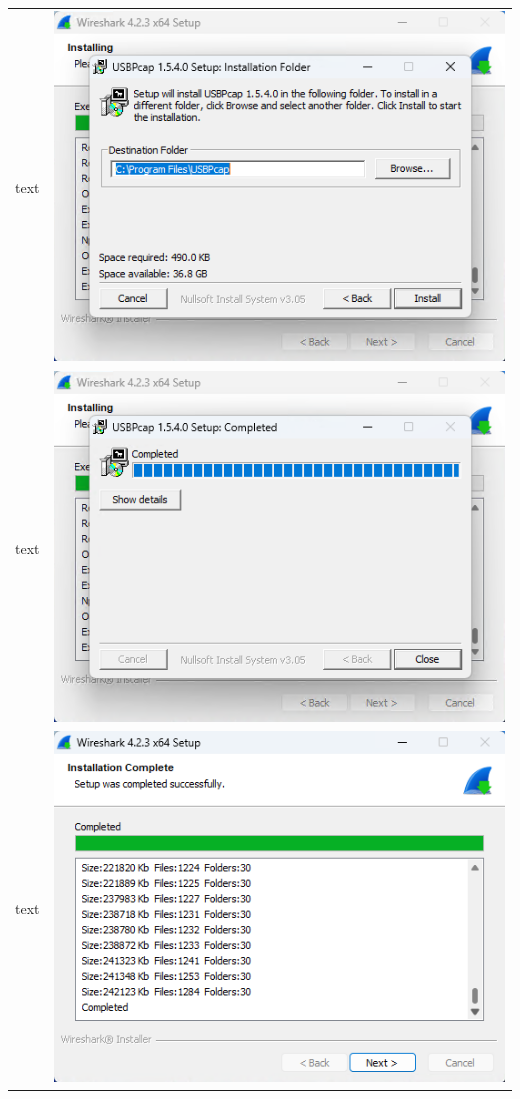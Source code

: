 \documentclass[11pt]{report}
\begin{document}
\begin{tabular}{ l r }
            text & \includegraphics[scale=1.0]{wireshark18} \\
            text & \includegraphics[scale=1.0]{wireshark19} \\
            text & \includegraphics[scale=1.0]{wireshark20} \\

\end{tabular}
\end{document}
